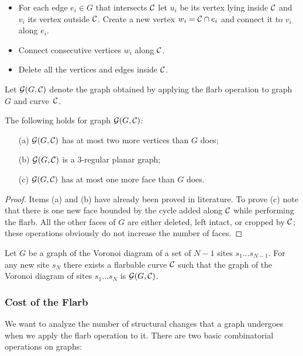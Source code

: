 \documentclass[a4paper,11pt]{article}
\begin{document}
\begin{itemize}
	\item For each edge $e_i \in G$ that intersects $\mathcal C$ let $u_i$ be its vertex lying inside $\mathcal C$ and $v_i$ its vertex outside $\mathcal C$. Create a new vertex $w_i = \mathcal C \cap e_i$ and connect it to $v_i$ along $e_i$.
	\item Connect consecutive vertices $w_i$ along $\mathcal C$.
	\item Delete all the vertices and edges inside $\mathcal C$.
\end{itemize}

Let $\mathcal G (G,\mathcal C)$ denote the graph obtained by applying the flarb operation to graph~$G$ and curve~$\mathcal C$.

\begin{lemma} The following holds for graph $\mathcal G ( G, \mathcal C )$: \begin{itemize}
	\item[(a)] $\mathcal G ( G, \mathcal C )$ has at most two more vertices than $G$ does;
	\item[(b)] $\mathcal G ( G, \mathcal C )$ is a 3-regular planar graph;
	\item[(c)] $\mathcal G ( G, \mathcal C )$ has at most one more face than $G$ does.
\end{itemize}\end{lemma}

\begin{proof}
	Items (a) and (b) have already been proved in literature. To prove (c) note that there is one new face bounded by the cycle added along $\mathcal C$ while performing the flarb. All the other faces of $G$ are either deleted, left intact, or cropped by $\mathcal C$; these operations obviously do not increase the number of faces.
\end{proof}

\begin{theorem}
	Let $G$ be a graph of the Voronoi diagram of a set of $N-1$ sites $s_1 \ldots s_{N-1}$. For any new site $s_N$ there exists a flarbable curve $\mathcal C$ such that the graph of the Voronoi diagram of sites $s_1 \ldots s_N$ is $\mathcal G (G, \mathcal C)$.
\end{theorem}

\subsubsection{Cost of the Flarb}

We want to analyze the number of structural changes that a graph undergoes when we apply the flarb operation to it. There are two basic combinatorial operations on graphs:
\end{document}
